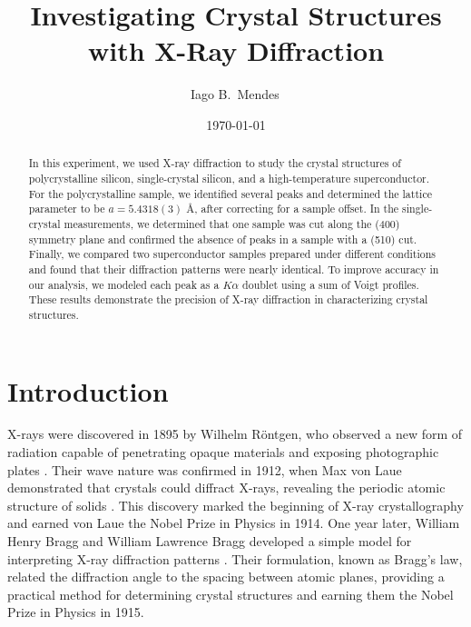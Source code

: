 \documentclass{../paper}
\begin{document}
\title{Investigating Crystal Structures with X-Ray Diffraction}

\author{Iago B.~Mendes\,}

\date{\today}

\begin{abstract}
  In this experiment, we used X-ray diffraction to study the crystal structures of polycrystalline silicon, single-crystal silicon, and a high-temperature superconductor. For the polycrystalline sample, we identified several peaks and determined the lattice parameter to be $a = 5.4318(3)$ \AA{}, after correcting for a sample offset. In the single-crystal measurements, we determined that one sample was cut along the (400) symmetry plane and confirmed the absence of peaks in a sample with a (510) cut. Finally, we compared two superconductor samples prepared under different conditions and found that their diffraction patterns were nearly identical. To improve accuracy in our analysis, we modeled each peak as a $K\alpha$ doublet using a sum of Voigt profiles. These results demonstrate the precision of X-ray diffraction in characterizing crystal structures.
\end{abstract}

\maketitle

\section{Introduction}

X-rays were discovered in 1895 by Wilhelm Röntgen, who observed a new form of radiation capable of penetrating opaque materials and exposing photographic plates \cite{Roentgen1896}. Their wave nature was confirmed in 1912, when Max von Laue demonstrated that crystals could diffract X-rays, revealing the periodic atomic structure of solids \cite{Laue1912}. This discovery marked the beginning of X-ray crystallography and earned von Laue the Nobel Prize in Physics in 1914. One year later, William Henry Bragg and William Lawrence Bragg developed a simple model for interpreting X-ray diffraction patterns \cite{Bragg1913}. Their formulation, known as Bragg's law, related the diffraction angle to the spacing between atomic planes, providing a practical method for determining crystal structures and earning them the Nobel Prize in Physics in 1915.
\end{document}
